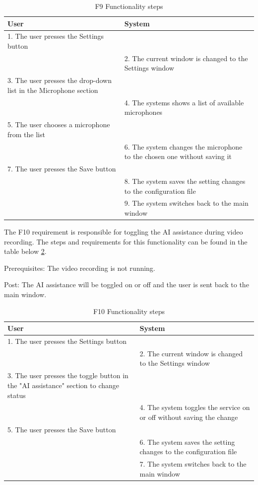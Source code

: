 \begin{table}[htbp]
\begin{center}
\begin{tabular}
{|p{180pt}|p{180pt}|}
\hline
 User & System\\
\hline 
\hline 1. The user presses the Settings button &  \\
\hline  & 2. The current window is changed to the Settings window \\
\hline 3. The user presses the drop-down list in the Microphone section&  \\
\hline  & 4. The systems shows a list of available microphones \\
\hline 5. The user chooses a microphone from the list &  \\
\hline  & 6. The system changes the microphone to the chosen one without saving it \\
\hline 7. The user presses the Save button &  \\
\hline  & 8. The system saves the setting changes to the configuration file \\
\hline  & 9. The system switches back to the main window \\
\hline
\end{tabular}
\end{center}
\caption{F9 Functionality steps}
\label{F9Table}
\end{table}

\par The F10 requirement is responsible for toggling the AI assistance during video recording. The steps and requirements for this functionality can be found in the table below \ref{F10Table}.
\par Prerequisites: The video recording is not running.
\par Post: The AI assistance will be toggled on or off and the user is sent back to the main window.

\begin{table}[htbp]
\begin{center}
\begin{tabular}
{|p{180pt}|p{180pt}|}
\hline
 User & System\\
\hline 
\hline 1. The user presses the Settings button &  \\
\hline  & 2. The current window is changed to the Settings window \\
\hline 3. The user presses the toggle button in the "AI assistance" section  to change status&  \\
\hline  & 4. The system toggles the service on or off without saving the change \\
\hline 5. The user presses the Save button &  \\
\hline  & 6. The system saves the setting changes to the configuration file \\
\hline  & 7. The system switches back to the main window \\
\hline
\end{tabular}
\end{center}
\caption{F10 Functionality steps}
\label{F10Table}
\end{table}


